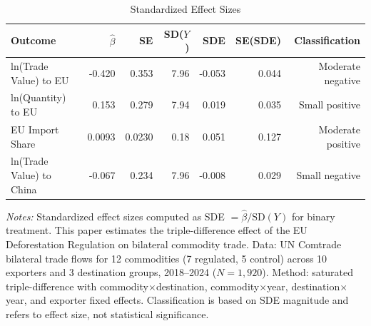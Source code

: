 \begin{table}[htbp]
\centering
\caption{Standardized Effect Sizes}
\label{tab:sde}
\small
\begin{tabular}{lrrrrrr}
\hline\hline
Outcome & $\hat{\beta}$ & SE & SD($Y$) & SDE & SE(SDE) & Classification \\
\hline
ln(Trade Value) to EU & -0.420 & 0.353 & 7.96 & -0.053 & 0.044 & Moderate negative \\
ln(Quantity) to EU & 0.153 & 0.279 & 7.94 & 0.019 & 0.035 & Small positive \\
EU Import Share & 0.0093 & 0.0230 & 0.18 & 0.051 & 0.127 & Moderate positive \\
ln(Trade Value) to China & -0.067 & 0.234 & 7.96 & -0.008 & 0.029 & Small negative \\
\hline\hline
\end{tabular}
\begin{minipage}{0.95\textwidth}
\vspace{0.3em}\footnotesize
\textit{Notes:} Standardized effect sizes computed as SDE $= \hat{\beta} / \text{SD}(Y)$ for binary treatment. This paper estimates the triple-difference effect of the EU Deforestation Regulation on bilateral commodity trade. Data: UN Comtrade bilateral trade flows for 12 commodities (7 regulated, 5 control) across 10 exporters and 3 destination groups, 2018--2024 ($N = 1,920$). Method: saturated triple-difference with commodity$\times$destination, commodity$\times$year, destination$\times$year, and exporter fixed effects. Classification is based on SDE magnitude and refers to effect size, not statistical significance.
\end{minipage}
\end{table}
